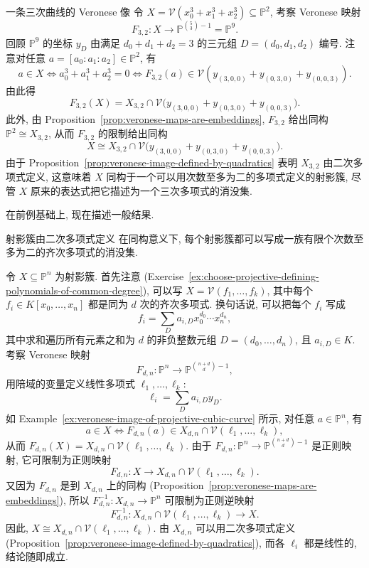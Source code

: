 \begin{Example}{一条三次曲线的 Veronese 像}\leavevmode\label{ex:veronese-image-of-projective-cubic-curve}
令 $X=\mathcal{V}(x_{0}^{3}+x_{1}^{3}+x_{2}^{3})\subseteq\mathbb{P}^{2}$, 考察 Veronese 映射
\[
  F_{3,2}:X\to\mathbb{P}^{\binom{5}{3}-1}=\mathbb{P}^{9}.
\]
回顾 $\mathbb{P}^{9}$ 的坐标 $y_{D}$ 由满足 $d_{0}+d_{1}+d_{2}=3$ 的三元组 $D=(d_{0},d_{1},d_{2})$ 编号. 注意对任意 $a=[a_{0}:a_{1}:a_{2}]\in\mathbb{P}^{2}$, 有
\[
  a\in X\iff a_{0}^{3}+a_{1}^{3}+a_{2}^{3}=0
  \iff F_{3,2}(a)\in\mathcal{V}(y_{(3,0,0)}+y_{(0,3,0)}+y_{(0,0,3)}).
\]
由此得
\[
  F_{3,2}(X)=X_{3,2}\cap\mathcal{V}\bigl(y_{(3,0,0)}+y_{(0,3,0)}+y_{(0,0,3)}\bigr).
\]
此外, 由 Proposition~\ref{prop:veronese-maps-are-embeddings}, $F_{3,2}$ 给出同构 $\mathbb{P}^{2}\cong X_{3,2}$, 从而 $F_{3,2}$ 的限制给出同构
\[
  X\cong X_{3,2}\cap\mathcal{V}\bigl(y_{(3,0,0)}+y_{(0,3,0)}+y_{(0,0,3)}\bigr).
\]
由于 Proposition~\ref{prop:veronese-image-defined-by-quadratics} 表明 $X_{3,2}$ 由二次多项式定义, 这意味着 $X$ 同构于一个可以用次数至多为二的多项式定义的射影簇, 尽管 $X$ 原来的表达式把它描述为一个三次多项式的消没集.
\end{Example}

在前例基础上, 现在描述一般结果.

\begin{Proposition}{射影簇由二次多项式定义}\leavevmode\label{prop:projective-varieties-defined-by-quadratics}
在同构意义下, 每个射影簇都可以写成一族有限个次数至多为二的齐次多项式的消没集.
\end{Proposition}
\begin{Proof}
令 $X\subseteq\mathbb{P}^{n}$ 为射影簇. 首先注意 (Exercise~\ref{ex:choose-projective-defining-polynomials-of-common-degree}), 可以写 $X=\mathcal{V}(f_{1},\ldots,f_{k})$, 其中每个 $f_{i}\in K[x_{0},\ldots,x_{n}]$ 都是同为 $d$ 次的齐次多项式. 换句话说, 可以把每个 $f_{i}$ 写成
\[
  f_{i}=\sum_{D}a_{i,D}x_{0}^{d_{0}}\cdots x_{n}^{d_{n}},
\]
其中求和遍历所有元素之和为 $d$ 的非负整数元组 $D=(d_{0},\ldots,d_{n})$, 且 $a_{i,D}\in K$. 考察 Veronese 映射
\[
  F_{d,n}:\mathbb{P}^{n}\to\mathbb{P}^{\binom{n+d}{d}-1},
\]
用陪域的变量定义线性多项式 $\ell_{1},\ldots,\ell_{k}$:
\[
  \ell_{i}=\sum_{D}a_{i,D}y_{D}.
\]
如 Example~\ref{ex:veronese-image-of-projective-cubic-curve} 所示, 对任意 $a\in\mathbb{P}^{n}$, 有
\[
  a\in X\iff F_{d,n}(a)\in X_{d,n}\cap\mathcal{V}(\ell_{1},\ldots,\ell_{k}),
\]
从而 $F_{d,n}(X)=X_{d,n}\cap\mathcal{V}(\ell_{1},\ldots,\ell_{k})$. 由于 $F_{d,n}:\mathbb{P}^{n}\to\mathbb{P}^{\binom{n+d}{d}-1}$ 是正则映射, 它可限制为正则映射
\[
  F_{d,n}:X\to X_{d,n}\cap\mathcal{V}(\ell_{1},\ldots,\ell_{k}).
\]
又因为 $F_{d,n}$ 是到 $X_{d,n}$ 上的同构 (Proposition~\ref{prop:veronese-maps-are-embeddings}), 所以 $F_{d,n}^{-1}:X_{d,n}\to\mathbb{P}^{n}$ 可限制为正则逆映射
\[
  F_{d,n}^{-1}:X_{d,n}\cap\mathcal{V}(\ell_{1},\ldots,\ell_{k})\to X.
\]
因此, $X\cong X_{d,n}\cap\mathcal{V}(\ell_{1},\ldots,\ell_{k})$. 由 $X_{d,n}$ 可以用二次多项式定义 (Proposition~\ref{prop:veronese-image-defined-by-quadratics}), 而各 $\ell_{i}$ 都是线性的, 结论随即成立.
\end{Proof}

